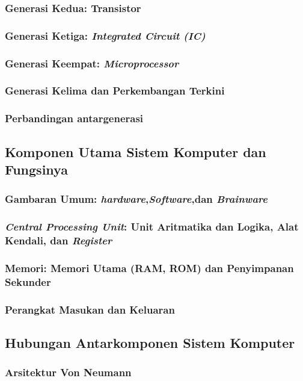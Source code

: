 \subsubsection{Generasi Kedua: Transistor}
\subsubsection{Generasi Ketiga: \textit{Integrated Circuit (IC)}}
\subsubsection{Generasi Keempat: \textit{Microprocessor}}
\subsubsection{Generasi Kelima dan Perkembangan Terkini}
\subsubsection{Perbandingan antargenerasi}

\subsection{Komponen Utama Sistem Komputer dan Fungsinya}
\subsubsection{Gambaran Umum: \textit{hardware},\textit{Software},dan \textit{Brainware}}
\subsubsection{\textit{Central Processing Unit}: Unit Aritmatika dan Logika, Alat Kendali, dan \textit{Register}}
\subsubsection{Memori: Memori Utama (RAM, ROM) dan Penyimpanan Sekunder}
\subsubsection{Perangkat Masukan dan Keluaran}

\subsection{Hubungan Antarkomponen Sistem Komputer}
\subsubsection{Arsitektur Von Neumann}
